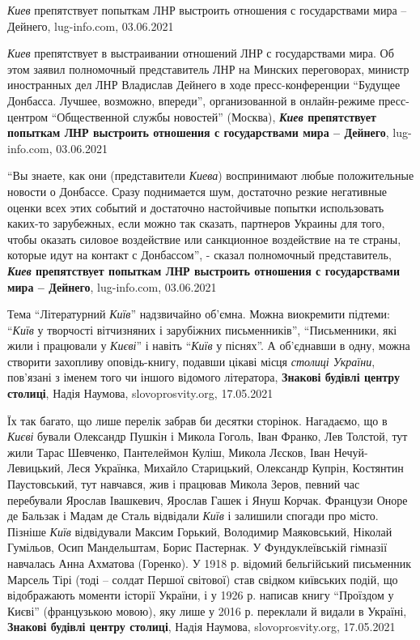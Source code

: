 \emph{Киев} препятствует попыткам ЛНР выстроить отношения с государствами мира
– Дейнего, lug-info.com, 03.06.2021

\emph{Киев} препятствует в выстраивании отношений ЛНР с государствами мира. Об этом
заявил полномочный представитель ЛНР на Минских переговорах, министр
иностранных дел ЛНР Владислав Дейнего в ходе пресс-конференции \enquote{Будущее
Донбасса. Лучшее, возможно, впереди}, организованной в онлайн-режиме
пресс-центром \enquote{Общественной службы новостей} (Москва),
\textbf{\emph{Киев} препятствует попыткам ЛНР выстроить отношения 
с государствами мира – Дейнего}, lug-info.com, 03.06.2021

\enquote{Вы знаете, как они (представители \emph{Киева}) воспринимают любые
положительные новости о Донбассе. Сразу поднимается шум, достаточно резкие
негативные оценки всех этих событий и достаточно настойчивые попытки
использовать каких-то зарубежных, если можно так сказать, партнеров Украины для
того, чтобы оказать силовое воздействие или санкционное воздействие на те
страны, которые идут на контакт с Донбассом}, - сказал полномочный
представитель, \textbf{\emph{Киев} препятствует попыткам ЛНР выстроить
отношения с государствами мира – Дейнего}, lug-info.com, 03.06.2021

Тема \enquote{Літературний \emph{Київ}} надзвичайно об'ємна. Можна виокремити підтеми:
\enquote{\emph{Київ} у творчості вітчизняних і зарубіжних письменників},
\enquote{Письменники, які жили і працювали у \emph{Києві}} і навіть \enquote{\emph{Київ} у
піснях}. А об'єднавши в одну, можна створити захопливу оповідь-книгу, подавши
цікаві місця \emph{столиці України}, пов'язані з іменем того чи іншого відомого
літератора, 
\textbf{Знакові будівлі центру столиці}, Надія Наумова, slovoprosvity.org, 17.05.2021

Їх так багато, що лише перелік забрав би десятки сторінок. Нагадаємо, що в
\emph{Києві} бували Олександр Пушкін і Микола Гоголь, Іван Франко, Лев Толстой,
тут жили Тарас Шевченко, Пантелеймон Куліш, Микола Лєсков, Іван
Нечуй-Левицький, Леся Українка, Михайло Старицький, Олександр Купрін, Костянтин
Паустовський, тут навчався, жив і працював Микола Зеров, певний час перебували
Ярослав Івашкевич, Ярослав Гашек і Януш Корчак. Французи Оноре де Бальзак і
Мадам де Сталь відвідали \emph{Київ} і залишили спогади про місто. Пізніше
\emph{Київ} відвідували Максим Горький, Володимир Маяковський, Ніколай
Гумільов, Осип Мандельштам, Борис Пастернак. У Фундуклеївській гімназії
навчалась Анна Ахматова (Горенко).  У 1918 р. відомий бельгійський письменник
Марсель Тірі (тоді – солдат Першої світової) став свідком київських подій, що
відображають моменти історії України, і у 1926 р. написав книгу
\enquote{Проїздом у Києві} (французькою мовою), яку лише у 2016 р. переклали й
видали в Україні,
\textbf{Знакові будівлі центру столиці}, Надія Наумова, slovoprosvity.org, 17.05.2021

